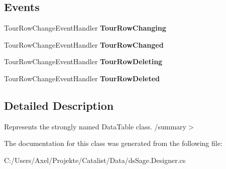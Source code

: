 \subsection*{Events}
\begin{DoxyCompactItemize}
\item 
Tour\+Row\+Change\+Event\+Handler {\bfseries Tour\+Row\+Changing}\hypertarget{class_products_1_1_data_1_1ds_sage_1_1_tour_data_table_a358105e30f66d470c9194975be4f5149}{}\label{class_products_1_1_data_1_1ds_sage_1_1_tour_data_table_a358105e30f66d470c9194975be4f5149}

\item 
Tour\+Row\+Change\+Event\+Handler {\bfseries Tour\+Row\+Changed}\hypertarget{class_products_1_1_data_1_1ds_sage_1_1_tour_data_table_ac1652269adc196c20e963cdc95af6be2}{}\label{class_products_1_1_data_1_1ds_sage_1_1_tour_data_table_ac1652269adc196c20e963cdc95af6be2}

\item 
Tour\+Row\+Change\+Event\+Handler {\bfseries Tour\+Row\+Deleting}\hypertarget{class_products_1_1_data_1_1ds_sage_1_1_tour_data_table_a0a4acec48832bd89cd8c2e8e1901006d}{}\label{class_products_1_1_data_1_1ds_sage_1_1_tour_data_table_a0a4acec48832bd89cd8c2e8e1901006d}

\item 
Tour\+Row\+Change\+Event\+Handler {\bfseries Tour\+Row\+Deleted}\hypertarget{class_products_1_1_data_1_1ds_sage_1_1_tour_data_table_a62d5d29820293c558ed22e135b7dd7f1}{}\label{class_products_1_1_data_1_1ds_sage_1_1_tour_data_table_a62d5d29820293c558ed22e135b7dd7f1}

\end{DoxyCompactItemize}


\subsection{Detailed Description}
Represents the strongly named Data\+Table class. /summary$>$ 

The documentation for this class was generated from the following file\+:\begin{DoxyCompactItemize}
\item 
C\+:/\+Users/\+Axel/\+Projekte/\+Catalist/\+Data/ds\+Sage.\+Designer.\+cs\end{DoxyCompactItemize}
